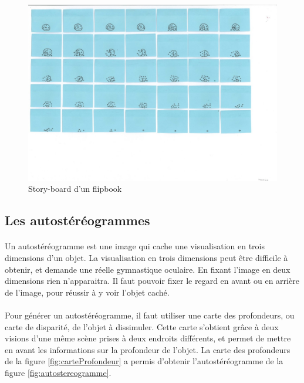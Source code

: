 \begin{figure}[h]
		\centering
		\includegraphics[]{flipbook.png}
		\caption{\label{fig:flipbook} Story-board d’un flipbook \protect \footnotemark }
\end{figure}

\subsection{Les autostéréogrammes}	

\paragraph{}
	Un autostéréogramme est une image qui cache une visualisation en trois dimensions d’un objet. La visualisation en trois dimensions peut être difficile à obtenir, et demande une réelle gymnastique oculaire. En fixant l’image en deux dimensions rien n’apparaitra. Il faut pouvoir fixer le regard en avant ou en arrière de l’image, pour réussir à y voir l’objet caché.	

\paragraph{}
	Pour générer un autostéréogramme, il faut utiliser une carte des profondeurs, ou carte de disparité, de l’objet à dissimuler. Cette carte s’obtient grâce à deux visions d’une même scène prises à deux endroits différents, et permet de mettre en avant les informations sur la profondeur de l’objet. La carte des profondeurs de la figure \ref{fig:carteProfondeur} a permis d’obtenir l’autostéréogramme de la figure \ref{fig:autostereogramme}.

